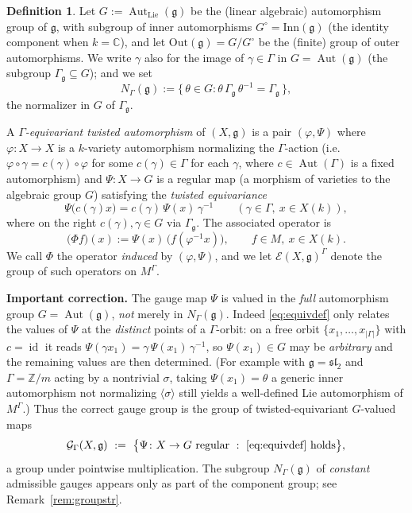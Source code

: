 \documentclass{amsart}
\theoremstyle{definition}
\newtheorem{definition}{Definition}
\DeclareMathOperator{\Aut}{Aut}
\DeclareMathOperator{\id}{id}
\newcommand{\g}{\mathfrak{g}}
\newcommand{\Z}{\mathbb{Z}}
\newcommand{\C}{\mathbb{C}}
\newcommand{\M}{M}
\begin{document}
\begin{definition}\label{def:emap}
Let $G:=\Aut_{\mathrm{Lie}}(\g)$ be the (linear algebraic) automorphism
group of $\g$, with subgroup of inner automorphisms $G^\circ=\mathrm{Inn}(\g)$
(the identity component when $k=\C$), and let
$\mathrm{Out}(\g)=G/G^\circ$ be the (finite) group of outer
automorphisms.  We write $\gamma$ also for the image of $\gamma\in\Gamma$ in
$G=\Aut(\g)$ (the subgroup $\Gamma_\g\subseteq G$); and we set
\[
N_\Gamma(\g):=\{\,\theta\in G:
\theta\,\Gamma_\g\,\theta^{-1}=\Gamma_\g\,\},
\]
the normalizer in $G$ of $\Gamma_\g$.

A \emph{$\Gamma$-equivariant twisted automorphism} of $(X,\g)$ is a pair
$(\varphi,\Psi)$ where $\varphi\colon X\to X$ is a $k$-variety
automorphism normalizing the $\Gamma$-action (i.e.\ $\varphi\circ\gamma=
c(\gamma)\circ\varphi$ for some $c(\gamma)\in\Gamma$ for each
$\gamma$, where $c\in\Aut(\Gamma)$ is a fixed automorphism) and
$\Psi\colon X\to G$ is a regular map (a morphism of varieties to the
algebraic group $G$) satisfying the \emph{twisted equivariance}
\begin{equation}\label{eq:equivdef}
\Psi\bigl(c(\gamma)x\bigr)=c(\gamma)\,\Psi(x)\,\gamma^{-1}
\qquad(\gamma\in\Gamma,\ x\in X(k)),
\end{equation}
where on the right $c(\gamma),\gamma\in G$ via $\Gamma_\g$.  The associated
operator is
\begin{equation}\label{eq:Phi}
\bigl(\Phi f\bigr)(x):=\Psi(x)\,\bigl(f(\varphi^{-1}x)\bigr),
\qquad f\in\M,\ x\in X(k).
\end{equation}
We call $\Phi$ the operator \emph{induced} by $(\varphi,\Psi)$, and we let
$\mathcal{E}(X,\g)^\Gamma$ denote the group of such operators on
$\M^\Gamma$.

\medskip
\noindent\textbf{Important correction.}  The gauge map $\Psi$ is valued in
the \emph{full} automorphism group $G=\Aut(\g)$, \emph{not} merely in
$N_\Gamma(\g)$.  Indeed \eqref{eq:equivdef} only relates the values of
$\Psi$ at the \emph{distinct} points of a $\Gamma$-orbit: on a free orbit
$\{x_1,\dots,x_{|\Gamma|}\}$ with $c=\id$ it reads
$\Psi(\gamma x_1)=\gamma\,\Psi(x_1)\,\gamma^{-1}$, so $\Psi(x_1)\in G$ may
be \emph{arbitrary} and the remaining values are then determined.  (For
example with $\g=\mathfrak{sl}_2$ and $\Gamma=\Z/m$ acting by a nontrivial
$\sigma$, taking $\Psi(x_1)=\theta$ a generic inner automorphism not
normalizing $\langle\sigma\rangle$ still yields a well-defined Lie
automorphism of $\M^\Gamma$.)  Thus the correct gauge group is the group of
twisted-equivariant $G$-valued maps
\begin{equation}\label{eq:gaugegroup}
\mathcal G_\Gamma(X,\g)\ :=\ \bigl\{\Psi\colon X\to G\ \text{regular}\ :\
\eqref{eq:equivdef}\ \text{holds}\bigr\},
\end{equation}
a group under pointwise multiplication.  The subgroup $N_\Gamma(\g)$ of
\emph{constant} admissible gauges appears only as part of the component
group; see Remark~\ref{rem:groupstr}.
\end{definition}
\end{document}
